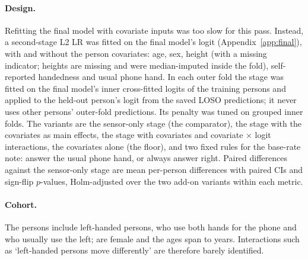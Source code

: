 \paragraph{Design.} Refitting the final model with covariate inputs was too slow for this pass. Instead, a
second-stage L2 LR was fitted on the final model's logit (Appendix~\ref{app:final}), with and without the person
covariates: age, sex, height (with a missing indicator;  heights are missing and
were median-imputed inside the fold), self-reported handedness and usual phone hand. In each outer fold the stage
was fitted on the final model's inner cross-fitted logits of the training persons and applied to the held-out
person's logit from the saved LOSO predictions; it never uses other persons' outer-fold predictions. Its penalty
was tuned on grouped inner folds. The variants are the sensor-only stage (the comparator), the stage with the
covariates as main effects, the stage with covariates and covariate $\times$ logit interactions, the covariates
alone (the floor), and two fixed rules for the base-rate note: answer the usual phone hand, or always answer right.
Paired differences against the sensor-only stage are mean per-person differences with paired CIs and sign-flip
$p$-values, Holm-adjusted over the two add-on variants within each metric.

\paragraph{Cohort.} The  persons include  left-handed
persons,  who use both hands for the phone and  who
usually use the left;  are female and the ages span  to
 years. Interactions such as `left-handed persons move differently' are therefore barely
identified.

